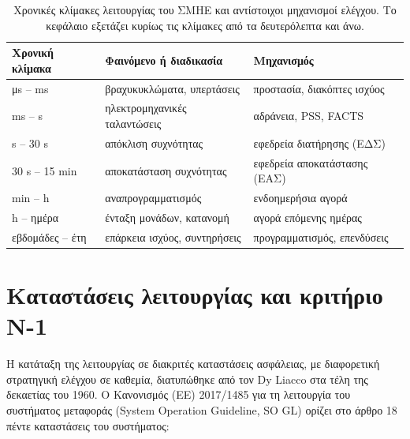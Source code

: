 \begin{table}[!htbp]
\centering
\begin{tabular}{lll}
\hline
Χρονική κλίμακα & Φαινόμενο ή διαδικασία & Μηχανισμός \\
\hline
μs -- ms   & βραχυκυκλώματα, υπερτάσεις   & προστασία, διακόπτες ισχύος \\
ms -- s    & ηλεκτρομηχανικές ταλαντώσεις & αδράνεια, PSS, FACTS \\
s -- 30 s  & απόκλιση συχνότητας          & εφεδρεία διατήρησης (ΕΔΣ) \\
30 s -- 15 min & αποκατάσταση συχνότητας  & εφεδρεία αποκατάστασης (ΕΑΣ) \\
min -- h   & αναπρογραμματισμός           & ενδοημερήσια αγορά \\
h -- ημέρα & ένταξη μονάδων, κατανομή     & αγορά επόμενης ημέρας \\
εβδομάδες -- έτη & επάρκεια ισχύος, συντηρήσεις & προγραμματισμός, επενδύσεις \\
\hline
\end{tabular}
\caption{Χρονικές κλίμακες λειτουργίας του ΣΜΗΕ και αντίστοιχοι μηχανισμοί ελέγχου. Το
κεφάλαιο εξετάζει κυρίως τις κλίμακες από τα δευτερόλεπτα και άνω.}
\label{tab:chronikes-klimakes}
\end{table}

\section{Καταστάσεις λειτουργίας και κριτήριο N-1}

Η κατάταξη της λειτουργίας σε διακριτές καταστάσεις ασφάλειας, με διαφορετική στρατηγική
ελέγχου σε καθεμία, διατυπώθηκε από τον Dy Liacco στα τέλη της δεκαετίας του 1960. Ο
Κανονισμός (ΕΕ) 2017/1485 για τη λειτουργία του συστήματος μεταφοράς (System Operation
Guideline, SO GL) ορίζει στο άρθρο 18 πέντε καταστάσεις του συστήματος:

